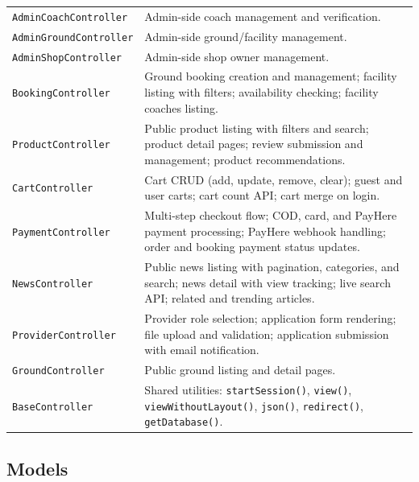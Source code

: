 \documentclass[12pt,a4paper]{report}
\begin{document}
\begin{center}
\begin{longtable}{p{5cm} p{9.5cm}}
\texttt{AdminCoachController} & Admin-side coach management and verification.\\
\texttt{AdminGroundController} & Admin-side ground/facility management.\\
\texttt{AdminShopController}  & Admin-side shop owner management.\\
\texttt{BookingController}    & Ground booking creation and management; facility listing with filters; availability checking; facility coaches listing.\\
\texttt{ProductController}    & Public product listing with filters and search; product detail pages; review submission and management; product recommendations.\\
\texttt{CartController}       & Cart CRUD (add, update, remove, clear); guest and user carts; cart count API; cart merge on login.\\
\texttt{PaymentController}    & Multi-step checkout flow; COD, card, and PayHere payment processing; PayHere webhook handling; order and booking payment status updates.\\
\texttt{NewsController}       & Public news listing with pagination, categories, and search; news detail with view tracking; live search API; related and trending articles.\\
\texttt{ProviderController}   & Provider role selection; application form rendering; file upload and validation; application submission with email notification.\\
\texttt{GroundController}     & Public ground listing and detail pages.\\
\texttt{BaseController}       & Shared utilities: \texttt{startSession()}, \texttt{view()}, \texttt{viewWithoutLayout()}, \texttt{json()}, \texttt{redirect()}, \texttt{getDatabase()}.\\
\bottomrule
\end{longtable}
\end{center}

\subsection{Models}
\end{document}
